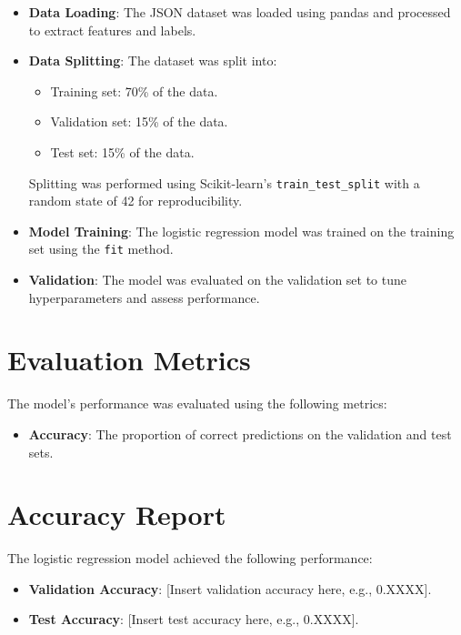 \documentclass[12pt, a4paper]{article}
\begin{document}
\begin{itemize}
    \item \textbf{Data Loading}: The JSON dataset was loaded using pandas and processed to extract features and labels.
    \item \textbf{Data Splitting}: The dataset was split into:
        \begin{itemize}
            \item Training set: 70\% of the data.
            \item Validation set: 15\% of the data.
            \item Test set: 15\% of the data.
        \end{itemize}
        Splitting was performed using Scikit-learn's \texttt{train\_test\_split} with a random state of 42 for reproducibility.
    \item \textbf{Model Training}: The logistic regression model was trained on the training set using the \texttt{fit} method.
    \item \textbf{Validation}: The model was evaluated on the validation set to tune hyperparameters and assess performance.
\end{itemize}

\section{Evaluation Metrics}
The model’s performance was evaluated using the following metrics:

\begin{itemize}
    \item \textbf{Accuracy}: The proportion of correct predictions on the validation and test sets.
\end{itemize}

\section{Accuracy Report}
The logistic regression model achieved the following performance:

\begin{itemize}
    \item \textbf{Validation Accuracy}: [Insert validation accuracy here, e.g., 0.XXXX].
    \item \textbf{Test Accuracy}: [Insert test accuracy here, e.g., 0.XXXX].
\end{itemize}
\end{document}
